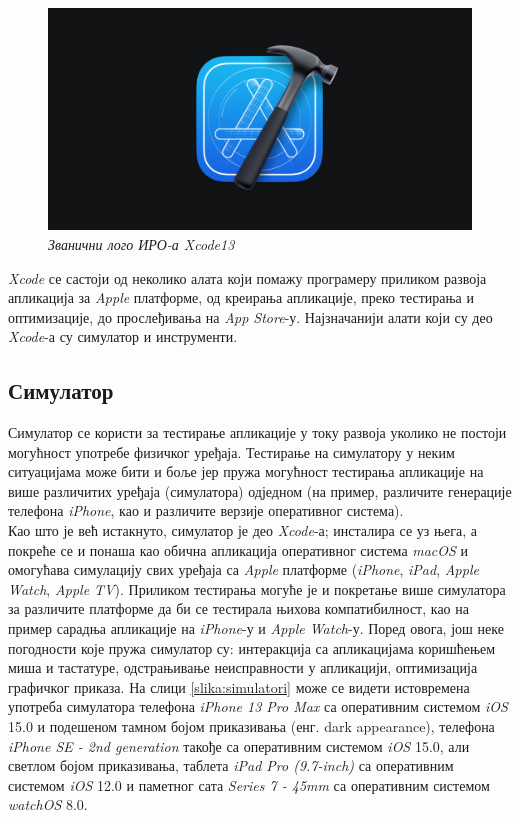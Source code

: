\documentclass[12pt,oneside]{memoir}
\begin{document}
\begin{figure}[H]
\includegraphics[width=1\textwidth]{images/Xcode_logo.jpg}
\centering
\caption{\textit{Званични лого ИРО-а Xcode13}}
\label{slika:xcode13_logo}
\end{figure}

\indent \textit{Xcode} се састоји од неколико алата који помажу програмеру приликом развоја апликација за \textit{Apple} платформе, од креирања апликације, преко тестирања и оптимизације, до прослеђивања на \textit{App Store}-у. Најзначанији алати који су део \textit{Xcode}-а су симулатор и инструменти.

\subsection{Симулатор}
\indent Симулатор се користи за тестирање апликације у току развоја уколико не постоји могућност употребе физичког уређаја. Тестирање на симулатору у неким ситуацијама може бити и боље јер пружа могућност тестирања апликације на више различитих уређаја (симулатора) одједном (на пример, различите генерације телефона \textit{iPhone}, као и различите верзије оперативног система). 
\\
\indent Као што је већ истакнуто, симулатор је део \textit{Xcode}-а; инсталира се уз њега, а покреће се и понаша као обична апликација оперативног система \textit{macOS} и омогућава симулацију свих уређаја са \textit{Apple} платформе (\textit{iPhone}, \textit{iPad}, \textit{Apple Watch}, \textit{Apple TV}). Приликом тестирања могуће је и покретање више симулатора за различите платформе да би се тестирала њихова компатибилност, као на пример сарадња апликације на \textit{iPhone}-у и \textit{Apple Watch}-у. 
Поред овога, још неке погодности које пружа симулатор су: интеракција са апликацијама коришћењем миша и тастатуре, одстрањивање неисправности у апликацији, оптимизација графичког приказа. На слици \ref{slika:simulatori} може се видети истовремена употреба симулатора телефона \textit{iPhone 13 Pro Max} са оперативним системом \textit{iOS} 15.0 и подешеном тамном бојом приказивања (енг. dark appearance), телефона \textit{iPhone SE - 2nd generation} такође са оперативним системом \textit{iOS} 15.0, али светлом бојом приказивања, таблета \textit{iPad Pro (9.7-inch)} са оперативним системом \textit{iOS} 12.0 и паметног сата \textit{Series 7 - 45mm} са оперативним системом \textit{watchOS} 8.0.
\end{document}

